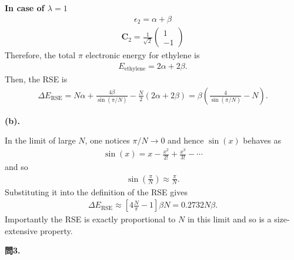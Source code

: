 \documentclass{jlreq}
\begin{document}
\noindent   
\textbf{In case of $\lambda=1$}\\ 
\begin{eqnarray}
    \epsilon_2=\alpha+\beta
\end{eqnarray}  
\begin{eqnarray}
    \mathbf{C}_2=\frac{1}{\sqrt{2}}
    \begin{pmatrix}
         1 \\
        -1
    \end{pmatrix}   
\end{eqnarray}
Therefore, the total $\pi$ electronic energy for ethylene is
\begin{eqnarray}
    E_\text{ethylene}=2\alpha+2\beta.
\end{eqnarray}  
Then, the RSE is
\begin{eqnarray}
    \Delta E_\text{RSE}=N\alpha+\frac{4\beta}{\sin(\pi/N)}-\frac{N}{2}\left(2\alpha+2\beta\right)=\beta\left(\frac{4}{\sin(\pi/N)}-N\right).
\end{eqnarray}

\noindent
\textbf{(b).}

In the limit of large $N$, one notices $\pi/N\rightarrow 0$ and hence $\sin(x)$ behaves as
\begin{eqnarray}
    \sin(x)=x-\frac{x^2}{2!}+\frac{x^3}{3!}-\cdots
\end{eqnarray}
and so
\begin{eqnarray}
    \sin\left(\frac{\pi}{N}\right)\approx\frac{\pi}{N}.
\end{eqnarray}
Substituting it into the definition of the RSE gives
\begin{eqnarray}
    \Delta E_\text{RSE}\approx\left[4\frac{N}{\pi}-1\right]\beta N=0.2732N\beta.
\end{eqnarray}
Importantly the RSE is exactly proportional to $N$ in this limit and so is a size-extensive property.

\clearpage

\noindent
\textbf{問3.}\\
\end{document}
